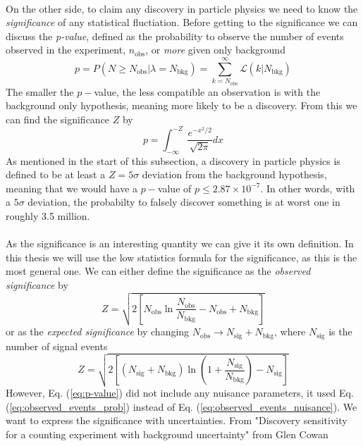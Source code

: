 \documentclass[12pt, a4paper]{book}
\begin{document}
\\On the other side, to claim any discovery in particle physics we need to know the \textit{significance} of any statistical fluctiation. Before getting to the significance we can discuss the \textit{p-value}, defined as the probability to observe the number of events observed in the experiment, $n_{\text{obs}}$, 
or \textit{more} given only background
\begin{equation}\label{eq:p-value}
    p = P(N\ge N_{\text{obs}}\vert \lambda = N_{\text{bkg}}) = \sum_{k=N_{\text{obs}}}^{\infty}\mathcal{L}(k\vert N_{\text{bkg}})
\end{equation}
The smaller the $p-$value, the less compatible an observation is with the background only hypothesis, meaning more likely to be a discovery. From this we can find the significance $Z$ by
$$
    p = \int_{-\infty}^{-Z} \frac{e^{-x^2/2}}{\sqrt{2\pi}}dx
$$
As mentioned in the start of this subsection, a discovery in particle physics is defined to be at least a $Z=5\sigma$ deviation from the background hypothesis, meaning that we would have a $p-$value of $p\le2.87\times10^{-7}$. In other words, with a $5\sigma$ deviation, the probabilty to 
falsely discover something is at worst one in roughly 3.5 million.\\ 
\\As the significance is an interesting quantity we can give it its own definition. In this thesis we will use the low statistics formula for the significance, as this is the most general one. We can either define the significance as the \textit{observed significance} by
\begin{equation}\label{eq:obs_sig}
    Z = \sqrt{2\left[N_{\text{obs}}\ln\frac{N_{\text{obs}}}{N_{\text{bkg}}}-N_{\text{obs}}+N_{\text{bkg}}\right]}
\end{equation}
or as the \textit{expected significance} by changing $N_{\text{obs}} \rightarrow N_{\text{sig}}+N_{\text{bkg}}$, where $N_{\text{sig}}$ is the number of signal events
\begin{equation}\label{eq:exp_sig}
    Z = \sqrt{2\left[(N_{\text{sig}}+N_{\text{bkg}})\ln\left(1+\frac{N_{\text{sig}}}{N_{\text{bkg}}}\right)-N_{\text{sig}}\right]}
\end{equation}
However, Eq. (\ref{eq:p-value}) did not include any nuisance parameters, it used Eq. (\ref{eq:observed_events_prob}) instead of Eq. (\ref{eq:observed_events_nuisance}). We want to express the significance with uncertainties. From "Discovery sensitivity for a counting experiment with background uncertainty" from Glen Cowan 
\end{document}
